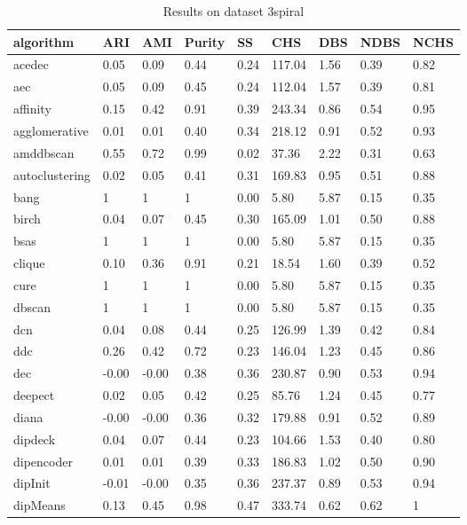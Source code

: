 \begin{table}[H]
\centering
\caption{Results on dataset 3spiral}
\label{tab:params:3spiral}
\begin{tabular}{|l|l|l|l|l|l|l|l|l|}
\hline
algorithm & ARI & AMI & Purity & SS & CHS & DBS & NDBS & NCHS \\
\hline
acedec & 0.05 & 0.09 & 0.44 & 0.24 & 117.04 & 1.56 & 0.39 & 0.82 \\
\hline
aec & 0.05 & 0.09 & 0.45 & 0.24 & 112.04 & 1.57 & 0.39 & 0.81 \\
\hline
affinity & 0.15 & 0.42 & 0.91 & 0.39 & 243.34 & 0.86 & 0.54 & 0.95 \\
\hline
agglomerative & 0.01 & 0.01 & 0.40 & 0.34 & 218.12 & 0.91 & 0.52 & 0.93 \\
\hline
amddbscan & 0.55 & 0.72 & 0.99 & 0.02 & 37.36 & 2.22 & 0.31 & 0.63 \\
\hline
autoclustering & 0.02 & 0.05 & 0.41 & 0.31 & 169.83 & 0.95 & 0.51 & 0.88 \\
\hline
bang & 1 & 1 & 1 & 0.00 & 5.80 & 5.87 & 0.15 & 0.35 \\
\hline
birch & 0.04 & 0.07 & 0.45 & 0.30 & 165.09 & 1.01 & 0.50 & 0.88 \\
\hline
bsas & 1 & 1 & 1 & 0.00 & 5.80 & 5.87 & 0.15 & 0.35 \\
\hline
clique & 0.10 & 0.36 & 0.91 & 0.21 & 18.54 & 1.60 & 0.39 & 0.52 \\
\hline
cure & 1 & 1 & 1 & 0.00 & 5.80 & 5.87 & 0.15 & 0.35 \\
\hline
dbscan & 1 & 1 & 1 & 0.00 & 5.80 & 5.87 & 0.15 & 0.35 \\
\hline
dcn & 0.04 & 0.08 & 0.44 & 0.25 & 126.99 & 1.39 & 0.42 & 0.84 \\
\hline
ddc & 0.26 & 0.42 & 0.72 & 0.23 & 146.04 & 1.23 & 0.45 & 0.86 \\
\hline
dec & -0.00 & -0.00 & 0.38 & 0.36 & 230.87 & 0.90 & 0.53 & 0.94 \\
\hline
deepect & 0.02 & 0.05 & 0.42 & 0.25 & 85.76 & 1.24 & 0.45 & 0.77 \\
\hline
diana & -0.00 & -0.00 & 0.36 & 0.32 & 179.88 & 0.91 & 0.52 & 0.89 \\
\hline
dipdeck & 0.04 & 0.07 & 0.44 & 0.23 & 104.66 & 1.53 & 0.40 & 0.80 \\
\hline
dipencoder & 0.01 & 0.01 & 0.39 & 0.33 & 186.83 & 1.02 & 0.50 & 0.90 \\
\hline
dipInit & -0.01 & -0.00 & 0.35 & 0.36 & 237.37 & 0.89 & 0.53 & 0.94 \\
\hline
dipMeans & 0.13 & 0.45 & 0.98 & 0.47 & 333.74 & 0.62 & 0.62 & 1 \\

\end{tabular}
\end{table}
